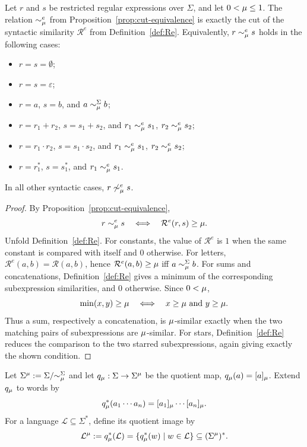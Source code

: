 \begin{theorem}\label{the:Re-cut-structural}
Let $r$ and $s$ be restricted regular expressions over $\Sigma$, and let
$0<\mu\le 1$. The relation $\sim_\mu^e$ from
Proposition~\ref{prop:cut-equivalence} is exactly the cut of the syntactic
similarity $\mathcal R^e$ from Definition~\ref{def:Re}. Equivalently,
$r\sim_\mu^e s$ holds in the following cases:
\begin{itemize}
  \item $r=s=\emptyset$;
  \item $r=s=\varepsilon$;
  \item $r=a$, $s=b$, and $a\sim_\mu^\Sigma b$;
  \item $r=r_1+r_2$, $s=s_1+s_2$, and
        $r_1\sim_\mu^e s_1$, $r_2\sim_\mu^e s_2$;
  \item $r=r_1\cdot r_2$, $s=s_1\cdot s_2$, and
        $r_1\sim_\mu^e s_1$, $r_2\sim_\mu^e s_2$;
  \item $r=r_1^\ast$, $s=s_1^\ast$, and $r_1\sim_\mu^e s_1$.
\end{itemize}
In all other syntactic cases, $r\not\sim_\mu^e s$.
\end{theorem}

\begin{proof}
By Proposition~\ref{prop:cut-equivalence},
\[
  r\sim_\mu^e s \quad\Longleftrightarrow\quad
  \mathcal R^e(r,s)\ge\mu.
\]
Unfold Definition~\ref{def:Re}. For constants, the value of
$\mathcal R^e$ is $1$ when the same constant is compared with itself and $0$
otherwise. For letters, $\mathcal R^e(a,b)=\mathcal R(a,b)$, hence
$\mathcal R^e(a,b)\ge\mu$ iff $a\sim_\mu^\Sigma b$.
For sums and concatenations, Definition~\ref{def:Re} gives a minimum of the
corresponding subexpression similarities, and
$0$ otherwise. Since $0<\mu$,
\[
  \min(x,y)\ge\mu
  \quad\Longleftrightarrow\quad
  x\ge\mu \text{ and } y\ge\mu.
\]
Thus a sum, respectively a concatenation, is $\mu$-similar exactly when the two
matching pairs of subexpressions are $\mu$-similar. For stars,
Definition~\ref{def:Re} reduces the comparison to the two starred
subexpressions, again giving exactly the shown condition.
\end{proof}

\begin{definition}\label{def:quotient-language-fuzzy}
Let $\Sigma^\mu := \Sigma/{\sim_\mu^\Sigma}$ and let
$q_\mu:\Sigma\to\Sigma^\mu$ be the quotient map, $q_\mu(a)=[a]_\mu$.
Extend $q_\mu$ to words by
\[
  q_\mu^*(a_1\cdots a_n) = [a_1]_\mu \cdots [a_n]_\mu.
\]
For a language $\mathcal L \subseteq \Sigma^*$, define its quotient image by
\[
  \mathcal L^\mu := q_\mu^*(\mathcal L)
  = \{q_\mu^*(w)\mid w\in\mathcal L\}
  \subseteq (\Sigma^\mu)^*.
\]
\end{definition}

